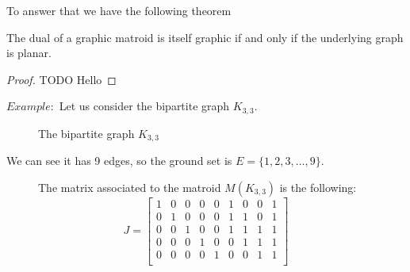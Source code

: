 To answer that we have the following theorem

\begin{theorem}
    \item  The dual of a graphic matroid is itself graphic if and only if the underlying graph is planar.
\end{theorem}

\begin{proof}
    TODO
    Hello
\end{proof}



$Example:$ Let us consider the bipartite graph $K_{3,3}$.
\begin{figure}[H]
\centering
{}
    \caption{The bipartite graph $K_{3,3}$}
    \label{fig:enter-label}
\end{figure}

We can see it has 9 edges, so the ground set is $E=\{1,2,3, \dots, 9\} $.

\begin{figure}[H]
The matrix associated to the matroid $M(K_{3,3})$ is the following:
$$J = \begin{bmatrix}
    1 & 0 & 0 & 0 & 0 & 1 & 0 & 0 & 1\\
    0 & 1 & 0 & 0 & 0 & 1 & 1 & 0 & 1\\
    0 & 0 & 1 & 0 & 0 & 1 & 1 & 1 & 1\\
    0 & 0 & 0 & 1 & 0 & 0 & 1 & 1 & 1\\
    0 & 0 & 0 & 0 & 1 & 0 & 0 & 1 & 1\\
\end{bmatrix}$$
\end{figure}

